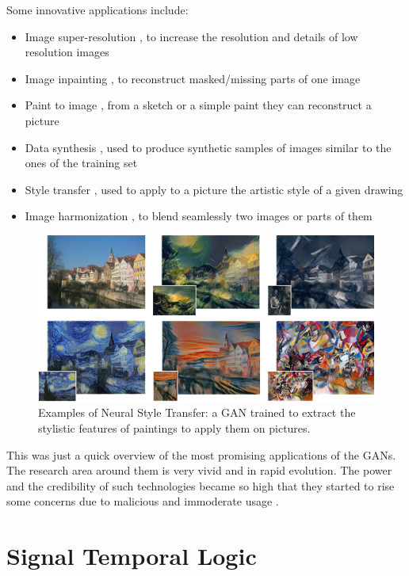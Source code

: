 Some innovative applications include:

\begin{itemize}
  \item Image super-resolution \cite{superres}, to increase the resolution and details of low resolution images
  \item Image inpainting \cite{inpainting}, to reconstruct masked/missing parts of one image
  \item Paint to image \cite{paintimg}, from a sketch or a simple paint they can reconstruct a picture
  \item Data synthesis \cite{datasynth}, used to produce synthetic samples of images similar to the ones of the training set
  \item Style transfer \cite{CycleGAN2017}, used to apply to a picture the artistic style of a given drawing
  \item Image harmonization \cite{harmonization}, to blend seamlessly two images or parts of them
\end{itemize}

\begin{figure}[H]
	\centering
	\includegraphics[width=12cm, keepaspectratio]{img/2_2_styletransfer_paintings.jpeg}
	\caption{Examples of Neural Style Transfer: a GAN trained to extract the stylistic features of paintings to apply them on pictures.}
\end{figure}

This was just a quick overview of the most promising applications of the GANs.
The research area around them is very vivid and in rapid evolution.
The power and the credibility of such technologies became so high that they started to rise some concerns due to malicious and immoderate usage \cite{tolosana2020deepfakes}.

\section{Signal Temporal Logic}

